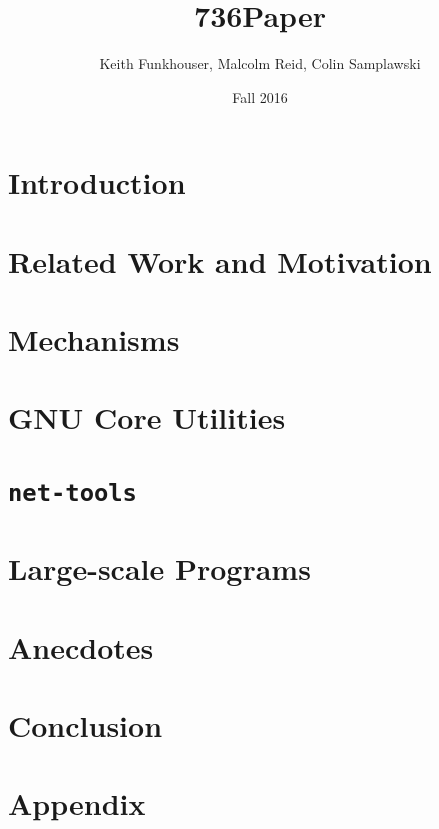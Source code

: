 \documentclass[10pt]{article}
\title{736Paper}
\author{Keith Funkhouser, Malcolm Reid, Colin Samplawski}
\date{Fall 2016}
\begin{document}
\setlength{\baselineskip}{18pt}
\maketitle

\section{Introduction}


\section{Related Work and Motivation}



\section{Mechanisms}




\section{GNU Core Utilities}


\section{\texttt{net-tools}}


\section{Large-scale Programs}


\section{Anecdotes}


\section{Conclusion}




\newpage
\appendix
\section*{Appendix}



\end{document}
